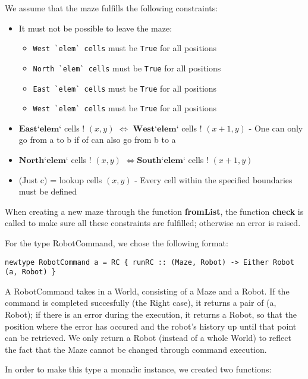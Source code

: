 \documentclass[a4paper]{article}
\newcommand{\west}{\ensuremath{\textbf{West}}\xspace}
\newcommand{\east}{\ensuremath{\textbf{East}}\xspace}
\newcommand{\south}{\ensuremath{\textbf{South}}\xspace}
\newcommand{\north}{\ensuremath{\textbf{North}}\xspace}
\newcommand{\el}{\ensuremath{\textbf{`elem`}}\xspace}
\begin{document}
We assume that the maze fulfills the following constraints:  

\begin{itemize}
  \item It must not be possible to leave the maze:
    \begin{itemize}\setlength{\itemsep}{-2pt}
      \item \verb|West `elem` cells| must be \texttt{True} for all positions 
      \item \verb|North `elem` cells| must be \texttt{True} for all positions 
      \item \verb|East `elem` cells| must be \texttt{True} for all positions 
      \item \verb|West `elem` cells| must be \texttt{True} for all positions 
    \end{itemize}
  \item \east \el cells ! $(x, y)$ $\Leftrightarrow$ \west \el cells ! $(x+1, y)$ - One can only go from a to b if of can also go from b to a
  \item \north \el cells ! $(x, y)$ $\Leftrightarrow$\south \el cells ! $(x+1, y)$
  \item (Just c) = lookup cells $(x,y)$ - Every cell within the specified boundaries must be defined
\end{itemize}
When creating a new maze through the function \textbf{fromList}, the function \textbf{check} is called to make sure all these constraints are fulfilled; otherwise an error is raised.

For the type RobotCommand, we chose the following format:
\begin{verbatim}
newtype RobotCommand a = RC { runRC :: (Maze, Robot) -> Either Robot (a, Robot) }
\end{verbatim}
A RobotCommand takes in a World, consisting of a Maze and a Robot. If the command is completed succesfully (the Right case), it returns a pair of (a, Robot); if there is an error during the execution, it returns a Robot, so that the position where the error has occured and the robot's history up until that point can be retrieved. We only return a Robot (instead of a whole World) to reflect the fact that the Maze cannot be changed through command execution.

In order to make this type a monadic instance, we created two functions:
\end{document}
